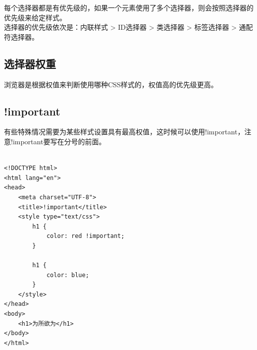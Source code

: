 每个选择器都是有优先级的，如果一个元素使用了多个选择器，则会按照选择器的优先级来给定样式。 \\

选择器的优先级依次是：内联样式 > ID选择器 > 类选择器 > 标签选择器 > 通配符选择器。

\subsection{选择器权重}

浏览器是根据权值来判断使用哪种CSS样式的，权值高的优先级更高。

\begin{table}[H]
	\centering
	\caption{选择器权重}
\end{table}

\subsection{!important}

有些特殊情况需要为某些样式设置具有最高权值，这时候可以使用!important，注意!important要写在分号的前面。 \\

 \\

\begin{lstlisting}[style=htmlcssjs]
<!DOCTYPE html>
<html lang="en">
<head>
    <meta charset="UTF-8">
    <title>!important</title>
    <style type="text/css">
        h1 {
            color: red !important;
        }

        h1 {
            color: blue;
        }
    </style>
</head>
<body>
    <h1>为所欲为</h1>
</body>
</html>
\end{lstlisting}

